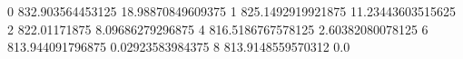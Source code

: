 0 832.903564453125 18.98870849609375
1 825.1492919921875 11.23443603515625
2 822.01171875 8.09686279296875
4 816.5186767578125 2.60382080078125
6 813.944091796875 0.02923583984375
8 813.9148559570312 0.0
